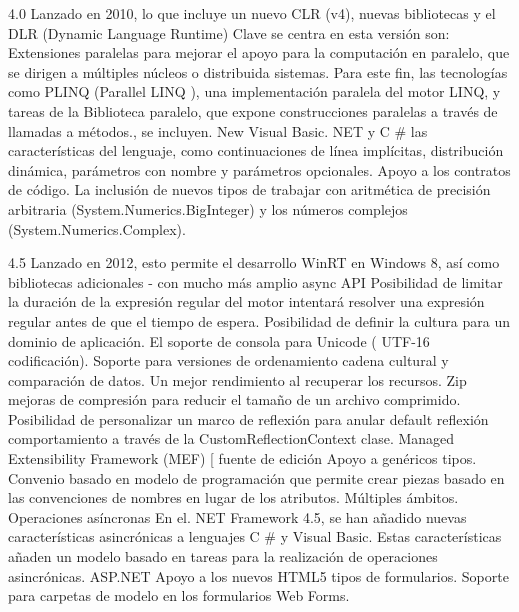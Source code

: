4.0
Lanzado en 2010, lo que incluye un nuevo CLR (v4), nuevas bibliotecas y el DLR (Dynamic Language Runtime)
Clave se centra en esta versión son:
Extensiones paralelas para mejorar el apoyo para la computación en paralelo, que se dirigen a múltiples núcleos o distribuida sistemas. Para este fin, las tecnologías como PLINQ (Parallel LINQ ), una implementación paralela del motor LINQ, y tareas de la Biblioteca paralelo, que expone construcciones paralelas a través de llamadas a métodos., se incluyen. New Visual Basic. NET y C \# las características del lenguaje, como continuaciones de línea implícitas, distribución dinámica, parámetros con nombre y parámetros opcionales. Apoyo a los contratos de código. La inclusión de nuevos tipos de trabajar con aritmética de precisión arbitraria (System.Numerics.BigInteger) y los números complejos (System.Numerics.Complex).

4.5
Lanzado en 2012, esto permite el desarrollo WinRT en Windows 8, así como bibliotecas adicionales - con mucho más amplio async API Posibilidad de limitar la duración de la expresión regular del motor intentará resolver una expresión regular antes de que el tiempo de espera. Posibilidad de definir la cultura para un dominio de aplicación. El soporte de consola para Unicode ( UTF-16 codificación). Soporte para versiones de ordenamiento cadena cultural y comparación de datos. Un mejor rendimiento al recuperar los recursos. Zip mejoras de compresión para reducir el tamaño de un archivo comprimido. Posibilidad de personalizar un marco de reflexión para anular default reflexión comportamiento a través de la CustomReflectionContext clase.
Managed Extensibility Framework (MEF) [ fuente de edición 
Apoyo a genéricos tipos.
Convenio basado en modelo de programación que permite crear piezas basado en las convenciones de nombres en lugar de los atributos.
Múltiples ámbitos.
Operaciones asíncronas 
En el. NET Framework 4.5, se han añadido nuevas características asincrónicas a lenguajes C \# y Visual Basic. Estas características añaden un modelo basado en tareas para la realización de operaciones asincrónicas.
ASP.NET
Apoyo a los nuevos HTML5 tipos de formularios. Soporte para carpetas de modelo en los formularios Web Forms.
